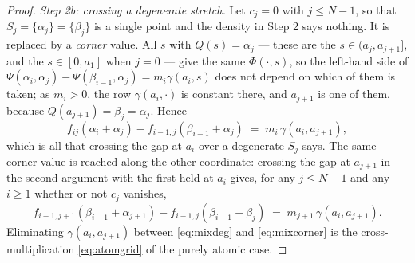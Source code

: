 \documentclass[11pt,a4paper]{article}
\theoremstyle{plain}
\theoremstyle{definition}
\theoremstyle{remark}
\begin{document}
\begin{proof}
  \emph{Step 2b: crossing a degenerate stretch.}  Let $c_j = 0$ with
  $j \leq N-1$, so that $S_j = \{\alpha_j\} = \{\beta_j\}$ is a single point and
  the density in Step 2 says nothing.  It is replaced by a \emph{corner} value.
  All $s$ with $Q(s) = \alpha_j$ --- these are the $s \in (a_j,a_{j+1}]$, and the
  $s \in [0,a_1]$ when $j = 0$ --- give the same $\Phi(\cdot,s)$, so the
  left-hand side of $\Psi(\alpha_i,\alpha_j) - \Psi(\beta_{i-1},\alpha_j) = m_i
  \gamma(a_i,s)$ does not depend on which of them is taken; as $m_i > 0$, the row
  $\gamma(a_i,\cdot)$ is constant there, and $a_{j+1}$ is one of them, because
  $Q(a_{j+1}) = \beta_j = \alpha_j$.  Hence
  \begin{equation}
    \label{eq:mixdeg}
    f_{ij}(\alpha_i + \alpha_j) - f_{i-1,j}(\beta_{i-1} + \alpha_j)
      \;=\; m_i\, \gamma(a_i,a_{j+1}) ,
  \end{equation}
  which is all that crossing the gap at $a_i$ over a degenerate $S_j$ says.  The
  same corner value is reached along the other coordinate: crossing the gap at
  $a_{j+1}$ in the second argument with the first held at $a_i$ gives, for any
  $j \leq N-1$ and any $i \geq 1$ whether or not $c_j$ vanishes,
  \begin{equation}
    \label{eq:mixcorner}
    f_{i-1,j+1}(\beta_{i-1} + \alpha_{j+1}) - f_{i-1,j}(\beta_{i-1} + \beta_j)
      \;=\; m_{j+1}\, \gamma(a_i,a_{j+1}) .
  \end{equation}
  Eliminating $\gamma(a_i,a_{j+1})$ between \eqref{eq:mixdeg} and
  \eqref{eq:mixcorner} is the cross-multiplication \eqref{eq:atomgrid} of the
  purely atomic case.


\end{proof}
\end{document}
